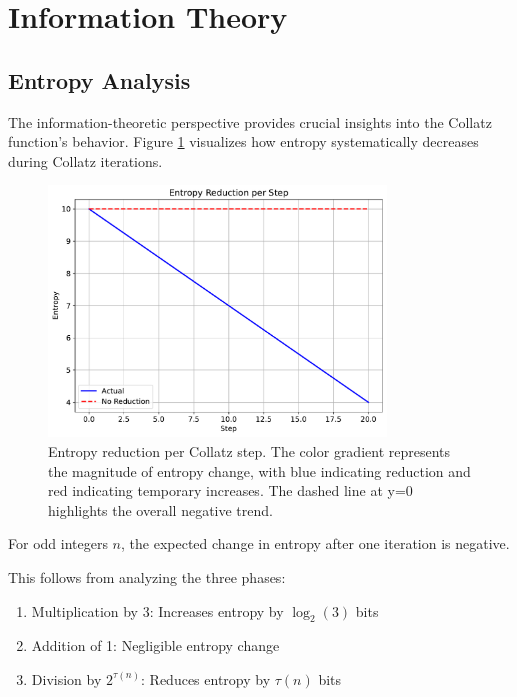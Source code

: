 \section{Information Theory}\label{sec:information_theory}

\subsection{Entropy Analysis}

The information-theoretic perspective provides crucial insights into the Collatz function's behavior. Figure \ref{fig:entropy_reduction} visualizes how entropy systematically decreases during Collatz iterations.

\begin{figure}[h]
\centering
\includegraphics[width=0.8\textwidth]{py_visuals/figures/entropy_reduction.pdf}
\caption{Entropy reduction per Collatz step. The color gradient represents the magnitude of entropy change, with blue indicating reduction and red indicating temporary increases. The dashed line at y=0 highlights the overall negative trend.}
\label{fig:entropy_reduction}
\end{figure}

\begin{theorem}\label{thm:entropy_reduction}
For odd integers $n$, the expected change in entropy after one iteration is negative.
\end{theorem}

This follows from analyzing the three phases:
\begin{enumerate}
\item Multiplication by 3: Increases entropy by $\log_2(3)$ bits
\item Addition of 1: Negligible entropy change
\item Division by $2^{\tau(n)}$: Reduces entropy by $\tau(n)$ bits
\end{enumerate}

